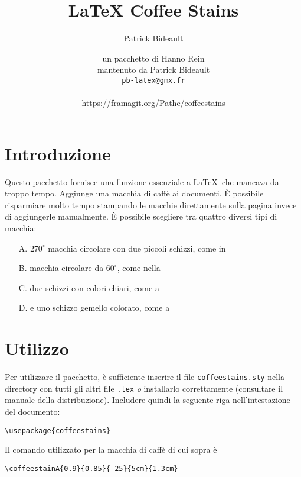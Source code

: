 \documentclass[a4paper, 11pt, BCOR = 0 pt, oneside]{scrartcl}
\author{Patrick Bideault}
\begin{document}
\title{LaTeX Coffee Stains}
\author{un pacchetto di Hanno Rein\\
mantenuto da Patrick Bideault\\
  \texttt{pb-latex@gmx.fr}\\
  ~\\
  \url{https://framagit.org/Pathe/coffeestains}}
\renewcommand{\today}{version \gitRel{} -- \DTMtoday{}}
\maketitle

\label{stainA}
\section{Introduzione}
Questo pacchetto fornisce una funzione essenziale a \LaTeX~che mancava da troppo
tempo. Aggiunge una macchia di caffè ai documenti. È possibile risparmiare molto
tempo stampando le macchie direttamente sulla pagina invece di aggiungerle
manualmente. È possibile scegliere tra quattro diversi tipi di macchia:
\begin{itemize}
\item[A.] $270^\circ$ macchia circolare con due piccoli schizzi, come in 
  \item[B.] macchia circolare da $60^\circ$, come nella 
  \item[C.] due schizzi con colori chiari, come a 
  \item[D.] e uno schizzo gemello colorato, come a 
\end{itemize}

\section{Utilizzo}
Per utilizzare il pacchetto, è sufficiente inserire il file \texttt{coffeestains.sty} nella directory con tutti gli altri file \texttt{.tex} \textit{o} installarlo correttamente (consultare il manuale della distribuzione). Includere quindi la seguente riga nell'intestazione del documento:
\begin{verbatim}
\usepackage{coffeestains}
\end{verbatim}

\vfill{}

\begin{tcolorbox}
  Il comando utilizzato per la macchia di caffè di cui sopra è

  \verb|\coffeestainA{0.9}{0.85}{-25}{5cm}{1.3cm}|
\end{tcolorbox}
\newpage{}
\label{stainB}
\end{document}
